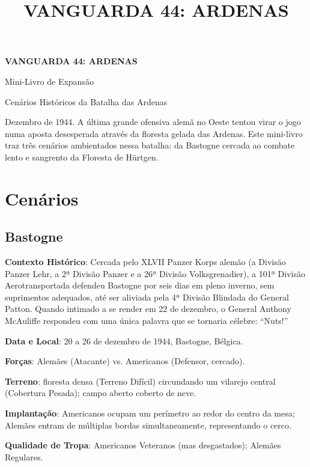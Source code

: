 \documentclass[11pt]{article}
\title{\bfseries\color{vinho}\Huge VANGUARDA 44: ARDENAS}
\author{}
\date{}
\begin{document}
\begin{titlepage}
\centering
\vspace*{3cm}
{\Huge\bfseries\color{vinho} VANGUARDA 44: ARDENAS \par}
\vspace{0.5cm}
{\Large\color{mostarda} Mini-Livro de Expansão \par}
\vspace{2cm}
{\large Cenários Históricos da Batalha das Ardenas \par}
\vfill
\end{titlepage}

\tableofcontents

\bigskip

Dezembro de 1944. A última grande ofensiva alemã no Oeste tentou virar o jogo numa aposta desesperada através da floresta gelada das Ardenas. Este mini-livro traz três cenários ambientados nessa batalha: da Bastogne cercada ao combate lento e sangrento da Floresta de Hürtgen.

\section{Cenários}

\subsection{Bastogne}

\textbf{Contexto Histórico}: Cercada pelo XLVII Panzer Korps alemão (a Divisão Panzer Lehr, a 2ª Divisão Panzer e a 26ª Divisão Volksgrenadier), a 101ª Divisão Aerotransportada defendeu Bastogne por seis dias em pleno inverno, sem suprimentos adequados, até ser aliviada pela 4ª Divisão Blindada do General Patton. Quando intimado a se render em 22 de dezembro, o General Anthony McAuliffe respondeu com uma única palavra que se tornaria célebre: ``Nuts!''

\textbf{Data e Local}: 20 a 26 de dezembro de 1944, Bastogne, Bélgica.

\textbf{Forças}: Alemães (Atacante) vs. Americanos (Defensor, cercado).

\textbf{Terreno}: floresta densa (Terreno Difícil) circundando um vilarejo central (Cobertura Pesada); campo aberto coberto de neve.

\textbf{Implantação}: Americanos ocupam um perímetro ao redor do centro da mesa; Alemães entram de múltiplas bordas simultaneamente, representando o cerco.

\textbf{Qualidade de Tropa}: Americanos Veteranos (mas desgastados); Alemães Regulares.
\end{document}
